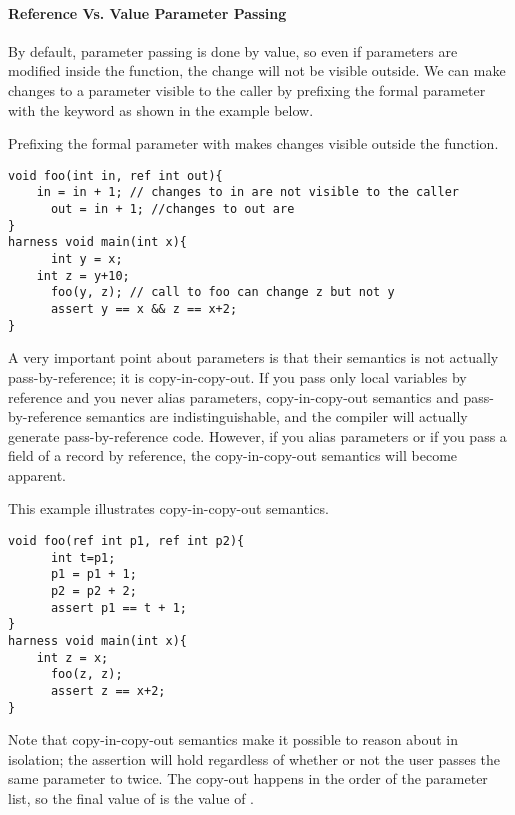 

\paragraph{Reference Vs. Value Parameter Passing}
By default, parameter passing is done by value, so even if parameters are modified inside the function, the change will not be visible outside. We can make changes to a parameter visible to the caller by prefixing the formal parameter with the keyword  as shown in the example below.

\begin{Example}
Prefixing the formal parameter with  makes changes visible outside the function.
\begin{lstlisting}
void foo(int in, ref int out){
	in = in + 1; // changes to in are not visible to the caller
      out = in + 1; //changes to out are
}
harness void main(int x){
      int y = x;
	int z = y+10;
      foo(y, z); // call to foo can change z but not y
      assert y == x && z == x+2;
}
\end{lstlisting}
\end{Example}

A very important point about  parameters is that their semantics is not actually pass-by-reference; it is copy-in-copy-out. If you pass only local variables by reference and you never alias  parameters, copy-in-copy-out semantics and pass-by-reference semantics are indistinguishable, and the compiler will actually generate pass-by-reference code. However, if you alias parameters or if you pass a field of a record by reference, the copy-in-copy-out semantics will become apparent.

\begin{Example}
This example illustrates copy-in-copy-out semantics.
\begin{lstlisting}
void foo(ref int p1, ref int p2){
      int t=p1;
      p1 = p1 + 1;
      p2 = p2 + 2;
      assert p1 == t + 1;
}
harness void main(int x){
	int z = x;
      foo(z, z);
      assert z == x+2;
}
\end{lstlisting}
Note that copy-in-copy-out semantics make it possible to reason about  in isolation; the assertion will hold regardless of whether or not the user passes the same parameter to  twice. The copy-out happens in the order of the parameter list, so the final value of  is the value of .
\end{Example}

